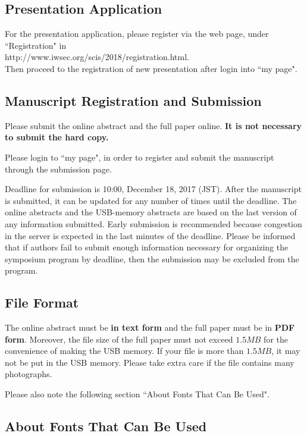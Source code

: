 \documentclass[a4paper]{article}
\begin{document}
\subsection{Presentation Application}

For the presentation application,
please register via the web page, under ``Registration" in \\ \mbox{http://www.iwsec.org/scis/2018/registration.html}.\\
Then proceed to the registration of new presentation after login into ``my page".

\subsection{Manuscript Registration and Submission}

Please submit the online abstract and the full paper online. {\bf It is not necessary to submit the hard copy.}

Please login to ``my page", in order to register and submit the manuscript through the submission page.

Deadline for submission is 10:00, December 18, 2017 (JST). 
After the manuscript is submitted, it can be updated for any number of times until the deadline.
The online abstracts and the USB-memory abstracts are based on the last version of any information submitted.
Early submission is recommended because congestion in the server is expected in the last minutes of the deadline.
Please be informed that if authors fail to submit enough information necessary for organizing the symposium program
by deadline, then the submission may be excluded from the program.


\subsection{File Format}

The online abstract must be {\bf in text form} and the full paper must be in {\bf PDF form}. Moreover, the file size of the full paper must not exceed $1.5MB$ for the convenience
of making the USB memory. If your file is more than $1.5MB$, it may not be put in the USB memory. Please take extra care if the file contains many photographs.

Please also note the following section ``About Fonts That Can Be Used".

\subsection{About Fonts That Can Be Used}
\end{document}
